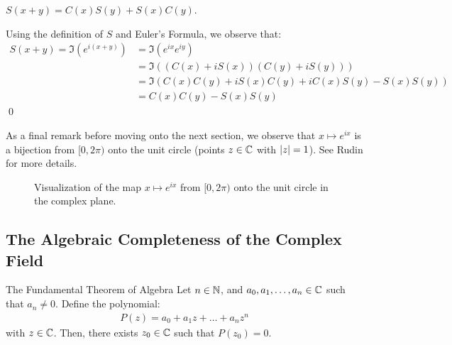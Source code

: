 \begin{ntheorem}{}{}
    $S(x + y) = C(x)S(y) + S(x)C(y)$.
\end{ntheorem}
\begin{nproof}
    Using the definition of $S$ and Euler's Formula, we observe that:
    \begin{align*}
        S(x + y) = \Im(e^{i(x + y)}) 
        &= \Im(e^{ix}e^{iy})
        \\ &= \Im((C(x) + iS(x))(C(y) + iS(y)))
        \\ &= \Im(C(x)C(y) + iS(x)C(y) + iC(x)S(y) - S(x)S(y))
        \\ &= C(x)C(y) - S(x)S(y)
    \end{align*} \qed
\end{nproof}
\noindent As a final remark before moving onto the next section, we observe that $x \mapsto e^{ix}$ is a bijection from $[0, 2\pi)$ onto the unit circle (points $z \in \mathbb{C}$ with $\abs{z} = 1$). See Rudin for more details.
\begin{figure}[htbp]
    \centering
    
    \caption{Visualization of the map $x \mapsto e^{ix}$ from $[0, 2\pi)$ onto the unit circle in the complex plane.}
    \label{fig55}
\end{figure}


\subsection{The Algebraic Completeness of the Complex Field}

\setcounter{rudin}{7}

\begin{theorem}{The Fundamental Theorem of Algebra}{}
    Let $n \in \mathbb{N}$, and $a_0, a_1, \ldots, a_n \in \mathbb{C}$ such that $a_n \neq 0$. Define the polynomial:
    \begin{align*}
        P(z) = a_0 + a_1z + \ldots + a_nz^n
    \end{align*}
    with $z \in \mathbb{C}$. Then, there exists $z_0 \in \mathbb{C}$ such that $P(z_0) = 0$. 
\end{theorem}

